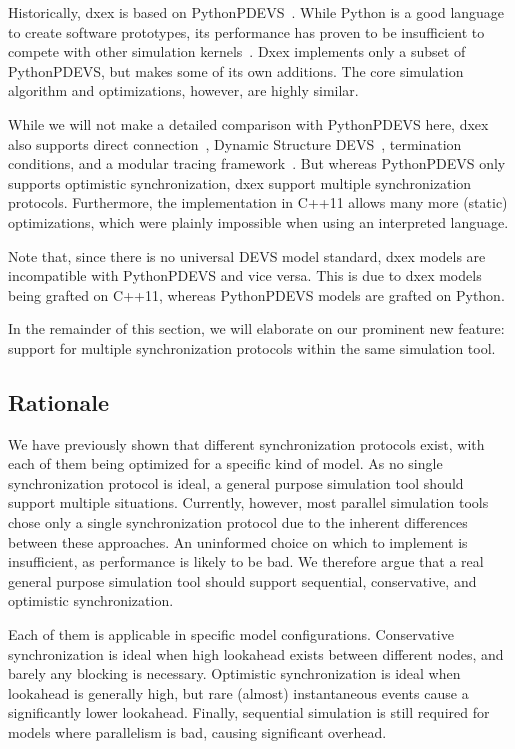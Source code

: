 Historically, dxex is based on PythonPDEVS~\cite{PythonPDEVS}.
While Python is a good language to create software prototypes, its performance has proven to be insufficient to compete with other simulation kernels~\cite{MasterThesis}.
Dxex implements only a subset of PythonPDEVS, but makes some of its own additions.
The core simulation algorithm and optimizations, however, are highly similar.

While we will not make a detailed comparison with PythonPDEVS here, dxex also supports direct connection~\cite{SymbolicFlattening}, \textsf{Dynamic Structure DEVS}~\cite{DSDEVS}, termination conditions, and a modular tracing framework~\cite{PythonPDEVS}.
But whereas PythonPDEVS only supports optimistic synchronization, dxex support multiple synchronization protocols.
Furthermore, the implementation in C++11 allows many more (static) optimizations, which were plainly impossible when using an interpreted language.

Note that, since there is no universal \textsf{DEVS} model standard, dxex models are incompatible with PythonPDEVS and vice versa.
This is due to dxex models being grafted on C++11, whereas PythonPDEVS models are grafted on Python.

In the remainder of this section, we will elaborate on our prominent new feature: support for multiple synchronization protocols within the same simulation tool.

\subsection{Rationale}
We have previously shown that different synchronization protocols exist, with each of them being optimized for a specific kind of model.
As no single synchronization protocol is ideal, a general purpose simulation tool should support multiple situations.
Currently, however, most parallel simulation tools chose only a single synchronization protocol due to the inherent differences between these approaches.
An uninformed choice on which to implement is insufficient, as performance is likely to be bad.
We therefore argue that a real general purpose simulation tool should support sequential, conservative, and optimistic synchronization.

Each of them is applicable in specific model configurations.
Conservative synchronization is ideal when high lookahead exists between different nodes, and barely any blocking is necessary.
Optimistic synchronization is ideal when lookahead is generally high, but rare (almost) instantaneous events cause a significantly lower lookahead.
Finally, sequential simulation is still required for models where parallelism is bad, causing significant overhead.

